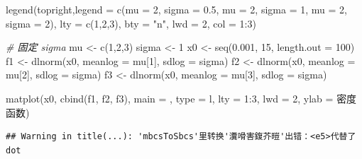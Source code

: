 \documentclass[
]{book}
\newenvironment{Shaded}{\begin{snugshade}}{\end{snugshade}}
\newcommand{\AttributeTok}[1]{\textcolor[rgb]{0.77,0.63,0.00}{#1}}
\newcommand{\CommentTok}[1]{\textcolor[rgb]{0.56,0.35,0.01}{\textit{#1}}}
\newcommand{\DecValTok}[1]{\textcolor[rgb]{0.00,0.00,0.81}{#1}}
\newcommand{\FloatTok}[1]{\textcolor[rgb]{0.00,0.00,0.81}{#1}}
\newcommand{\FunctionTok}[1]{\textcolor[rgb]{0.00,0.00,0.00}{#1}}
\newcommand{\NormalTok}[1]{#1}
\newcommand{\OtherTok}[1]{\textcolor[rgb]{0.56,0.35,0.01}{#1}}
\newcommand{\SpecialCharTok}[1]{\textcolor[rgb]{0.00,0.00,0.00}{#1}}
\newcommand{\StringTok}[1]{\textcolor[rgb]{0.31,0.60,0.02}{#1}}
\begin{document}
\begin{Shaded}
\begin{Highlighting}[]
\FunctionTok{legend}\NormalTok{(}\StringTok{\textquotesingle{}topright\textquotesingle{}}\NormalTok{,}\AttributeTok{legend =} \FunctionTok{c}\NormalTok{(}\StringTok{\textquotesingle{}mu = 2, sigma = 0.5\textquotesingle{}}\NormalTok{, }
                             \StringTok{\textquotesingle{}mu = 2, sigma = 1\textquotesingle{}}\NormalTok{, }
                             \StringTok{\textquotesingle{}mu = 2, sigma = 2\textquotesingle{}}\NormalTok{),}
       \AttributeTok{lty =} \FunctionTok{c}\NormalTok{(}\DecValTok{1}\NormalTok{,}\DecValTok{2}\NormalTok{,}\DecValTok{3}\NormalTok{), }\AttributeTok{bty =} \StringTok{"n"}\NormalTok{, }\AttributeTok{lwd =} \DecValTok{2}\NormalTok{,  }\AttributeTok{col =} \DecValTok{1}\SpecialCharTok{:}\DecValTok{3}\NormalTok{)}

\CommentTok{\# 固定 sigma}
\NormalTok{mu }\OtherTok{\textless{}{-}} \FunctionTok{c}\NormalTok{(}\DecValTok{1}\NormalTok{,}\DecValTok{2}\NormalTok{,}\DecValTok{3}\NormalTok{)}
\NormalTok{sigma }\OtherTok{\textless{}{-}} \DecValTok{1}
\NormalTok{x0 }\OtherTok{\textless{}{-}} \FunctionTok{seq}\NormalTok{(}\FloatTok{0.001}\NormalTok{, }\DecValTok{15}\NormalTok{, }\AttributeTok{length.out =} \DecValTok{100}\NormalTok{)}
\NormalTok{f1 }\OtherTok{\textless{}{-}} \FunctionTok{dlnorm}\NormalTok{(x0,  }\AttributeTok{meanlog =}\NormalTok{ mu[}\DecValTok{1}\NormalTok{], }\AttributeTok{sdlog =}\NormalTok{ sigma)}
\NormalTok{f2 }\OtherTok{\textless{}{-}} \FunctionTok{dlnorm}\NormalTok{(x0,  }\AttributeTok{meanlog =}\NormalTok{ mu[}\DecValTok{2}\NormalTok{], }\AttributeTok{sdlog =}\NormalTok{ sigma)}
\NormalTok{f3 }\OtherTok{\textless{}{-}} \FunctionTok{dlnorm}\NormalTok{(x0,  }\AttributeTok{meanlog =}\NormalTok{ mu[}\DecValTok{3}\NormalTok{], }\AttributeTok{sdlog =}\NormalTok{ sigma)}

\FunctionTok{matplot}\NormalTok{(x0, }\FunctionTok{cbind}\NormalTok{(f1, f2, f3), }\AttributeTok{main =} \StringTok{\textquotesingle{}\textquotesingle{}}\NormalTok{,  }\AttributeTok{type =} \StringTok{\textquotesingle{}l\textquotesingle{}}\NormalTok{, }\AttributeTok{lty =} \DecValTok{1}\SpecialCharTok{:}\DecValTok{3}\NormalTok{, }\AttributeTok{lwd =} \DecValTok{2}\NormalTok{, }\AttributeTok{ylab =} \StringTok{\textquotesingle{}密度函数\textquotesingle{}}\NormalTok{)}
\end{Highlighting}
\end{Shaded}

\begin{verbatim}
## Warning in title(...): 'mbcsToSbcs'里转换'瀵嗗害鍑芥暟'出错：<e5>代替了dot
\end{verbatim}
\end{document}
